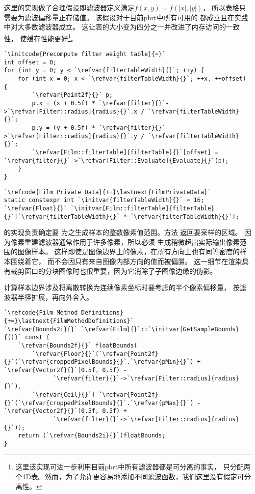 这里的实现做了合理假设即滤波器定义满足$f(x,y)=f(|x|,|y|)$，
所以表格只需要为滤波偏移量正存储值。
该假设对于目前pbrt中所有可用的
都成立且在实践中对大多数滤波器成立。
这让表的大小变为四分之一并改进了内存访问的一致性，
使缓存性能更好\footnote{这里该实现可进一步利用目前pbrt中所有滤波器都是可分离的事实，
只分配两个1D表。然而，为了允许更容易地添加不同滤波函数，我们这里没有假定可分离性。}。
\begin{lstlisting}
`\initcode{Precompute filter weight table}{=}`
int offset = 0;
for (int y = 0; y < `\refvar{filterTableWidth}{}`; ++y) {
    for (int x = 0; x < `\refvar{filterTableWidth}{}`; ++x, ++offset) {
        `\refvar{Point2f}{}` p;
        p.x = (x + 0.5f) * `\refvar{filter}{}`->`\refvar[Filter::radius]{radius}{}`.x / `\refvar{filterTableWidth}{}`;
        p.y = (y + 0.5f) * `\refvar{filter}{}`->`\refvar[Filter::radius]{radius}{}`.y / `\refvar{filterTableWidth}{}`;
        `\refvar[Film::filterTable]{filterTable}{}`[offset] = `\refvar{filter}{}`->`\refvar[Filter::Evaluate]{Evaluate}{}`(p);
    }
}
\end{lstlisting}
\begin{lstlisting}
`\refcode{Film Private Data}{+=}\lastnext{FilmPrivateData}`
static constexpr int `\initvar{filterTableWidth}{}` = 16;
`\refvar{Float}{}` `\initvar[Film::filterTable]{filterTable}{}`[`\refvar{filterTableWidth}{}` * `\refvar{filterTableWidth}{}`];
\end{lstlisting}

的实现负责确定要
为之生成样本的整数像素值范围。方法
返回要采样的区域。
因为像素重建滤波器通常作用于许多像素，所以必须
生成稍微超出实际输出像素范围的图像样本。
这样即使是图像边界上的像素，在所有方向上也有同等密度的样本围绕着它，
而不会因只有来自图像内部方向的值而被偏置。
这一细节在渲染具有裁剪窗口的分块图像时也很重要，因为它消除了子图像边缘的伪影。

计算样本边界涉及将离散转换为连续像素坐标时要考虑的半个像素偏移量，
按滤波器半径扩展，再向外舍入。
\begin{lstlisting}
`\refcode{Film Method Definitions}{+=}\lastnext{FilmMethodDefinitions}`
`\refvar{Bounds2i}{}` `\refvar{Film}{}`::`\initvar{GetSampleBounds}{()}` const {
    `\refvar{Bounds2f}{}` floatBounds(
        `\refvar{Floor}{}`(`\refvar{Point2f}{}`(`\refvar{croppedPixelBounds}{}`.`\refvar{pMin}{}`) + `\refvar{Vector2f}{}`(0.5f, 0.5f) -
              `\refvar{filter}{}`->`\refvar[Filter::radius]{radius}{}`),
        `\refvar{Ceil}{}`( `\refvar{Point2f}{}`(`\refvar{croppedPixelBounds}{}`.`\refvar{pMax}{}`) - `\refvar{Vector2f}{}`(0.5f, 0.5f) +
              `\refvar{filter}{}`->`\refvar[Filter::radius]{radius}{}`));
    return (`\refvar{Bounds2i}{}`)floatBounds;
}
\end{lstlisting}

